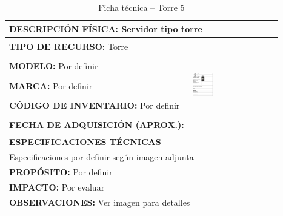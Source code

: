 \begin{table}[H]
\centering
\caption{Ficha técnica -- Torre 5}
\label{tab:torre-5}
\begin{tabular}{|p{}|p{}|}
\hline
\multicolumn{2}{|l|}{\textbf{DESCRIPCIÓN FÍSICA:} Servidor tipo torre} \\ \hline
\textbf{TIPO DE RECURSO:} Torre & 
\multirow{5}{*}{\includegraphics[width=0.25\textwidth,height=4cm,keepaspectratio]{tablas-images/cp1/torres/torre-5.png}} \\ \cline{1-1}
\textbf{MODELO:} Por definir & \\ \cline{1-1}
\textbf{MARCA:} Por definir & \\ \cline{1-1}
\textbf{CÓDIGO DE INVENTARIO:} Por definir & \\ \cline{1-1}
\textbf{FECHA DE ADQUISICIÓN (APROX.):} & \\ \hline
\multicolumn{2}{|l|}{\textbf{ESPECIFICACIONES TÉCNICAS}} \\ \hline
\multicolumn{2}{|p{0.95\textwidth}|}{
\footnotesize
Especificaciones por definir según imagen adjunta
} \\ \hline
\multicolumn{2}{|l|}{\textbf{PROPÓSITO:} Por definir} \\ \hline
\multicolumn{2}{|l|}{\textbf{IMPACTO:} Por evaluar} \\ \hline
\multicolumn{2}{|l|}{\textbf{OBSERVACIONES:} Ver imagen para detalles} \\ \hline
\end{tabular}
\end{table}

